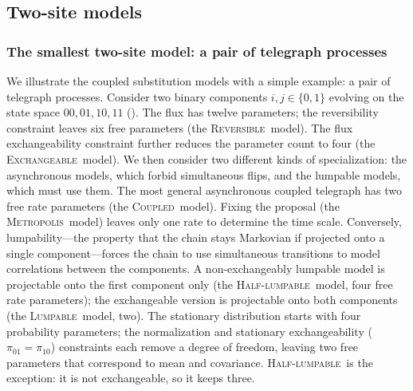 \documentclass[11pt]{article}
\newcommand{\Reversible}{\textsc{Reversible}}
\newcommand{\Coupledm}{\textsc{Coupled}}
\newcommand{\Exchm}{\textsc{Exchangeable}}
\newcommand{\Metrop}{\textsc{Metropolis}}
\newcommand{\Lumpm}{\textsc{Lumpable}}
\newcommand{\Halflump}{\textsc{Half-lumpable}}
\begin{document}

\subsection{Two-site models}
\label{sec:pair}
\subsubsection{The smallest two-site model: a pair of telegraph processes}
\label{sec:pairbinary}
We illustrate the coupled substitution models with a simple example: a pair of telegraph processes.
Consider two binary components $i,j\in\{0,1\}$ evolving on the state space $00,01,10,11$ ().
The flux has twelve parameters; the reversibility constraint leaves six free parameters (the \Reversible\ model).
The flux exchangeability constraint further reduces the parameter count to four (the \Exchm\ model).
We then consider two different kinds of specialization: the asynchronous models, which forbid simultaneous flips, and the lumpable models, which must use them.
The most general asynchronous coupled telegraph has two free rate parameters (the \Coupledm\ model).
Fixing the proposal (the \Metrop\ model) leaves only one rate to determine the time scale.
Conversely, lumpability---the property that the chain stays Markovian if projected onto a single component---forces the chain to use simultaneous transitions to model correlations between the components.
A non-exchangeably lumpable model is projectable onto the first component only (the \Halflump\ model, four free rate parameters); the exchangeable version is projectable onto both components (the \Lumpm\ model, two).
The stationary distribution starts with four probability parameters; the normalization and stationary exchangeability ($\pi_{01} = \pi_{10}$) constraints each remove a degree of freedom, leaving two free parameters that correspond to mean and covariance.
\Halflump\ is the exception: it is not exchangeable, so it keeps three.
\end{document}

